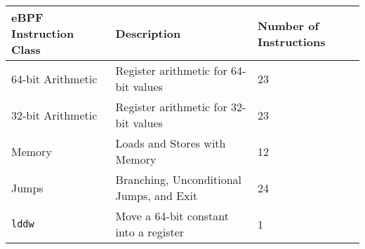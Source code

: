 \begin{tabular}{lll}
\toprule
eBPF Instruction Class & Description & Number of Instructions\\
\midrule
  64-bit Arithmetic & Register arithmetic for 64-bit values & 23 \\
  32-bit Arithmetic & Register arithmetic for 32-bit values & 23 \\
  Memory & Loads and Stores with Memory & 12 \\
  Jumps & Branching, Unconditional Jumps, and Exit & 24 \\
  \texttt{lddw} & Move a 64-bit constant into a register & 1 \\
\bottomrule
\end{tabular}
